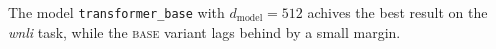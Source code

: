 The model \texttt{transformer\_base} with $d_{\text{model}}=512$ achives the best result on the \textit{wnli} task, while the \textsc{base} variant lags behind by a small margin.
